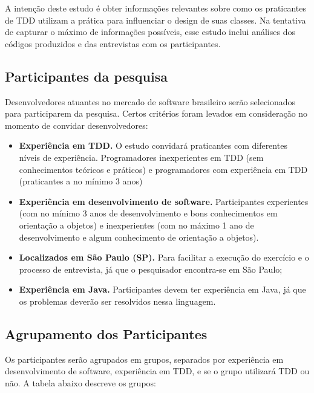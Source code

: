 A intenção deste estudo é obter informações relevantes sobre como os
praticantes de TDD utilizam a prática para influenciar o design de suas
classes. Na tentativa de capturar o máximo de informações possíveis, esse estudo
inclui análises dos códigos produzidos e das entrevistas com os participantes.

\subsection{Participantes da pesquisa}
\label{sec:planejamento-participantes}

Desenvolvedores atuantes no mercado de 
software brasileiro serão selecionados para participarem da pesquisa.
Certos critérios foram levados em consideração no momento de convidar desenvolvedores:

\begin{itemize}
	\item \textbf{Experiência em TDD.} O estudo convidará praticantes com diferentes
	níveis de experiência. Programadores inexperientes em TDD (sem conhecimentos teóricos e práticos)
	e programadores com experiência em TDD (praticantes a no mínimo 3 anos)
	
	\item \textbf{Experiência em desenvolvimento de software.} Participantes
	experientes (com no mínimo 3 anos de desenvolvimento e bons conhecimentos em orientação a objetos) e 
	inexperientes (com no máximo 1 ano de desenvolvimento e algum conhecimento de orientação a objetos).

	\item \textbf{Localizados em São Paulo (SP).} Para facilitar a execução do exercício
	e o processo de entrevista, já que o pesquisador encontra-se em São Paulo;

	\item \textbf{Experiência em Java.} 
	Participantes devem ter experiência em Java, já que os problemas deverão ser resolvidos
	nessa linguagem.	
\end{itemize}

\subsection{Agrupamento dos Participantes}

Os participantes serão agrupados em grupos, separados por experiência em desenvolvimento
de software, experiência em TDD, e se o grupo utilizará TDD ou não. A tabela abaixo
descreve os grupos:

